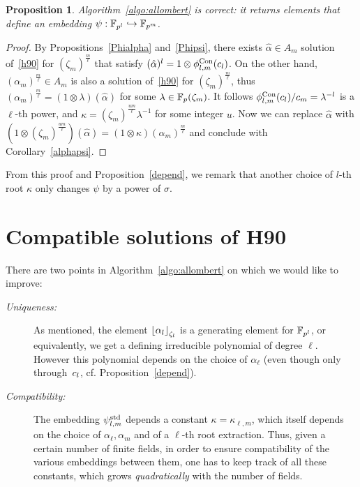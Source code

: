 \documentclass{sig-alternate}
\newtheorem{proposition}[theorem]{Proposition}
\begin{document}
\begin{proposition}
  Algorithm~\ref{algo:allombert} is correct: it returns elements that define an
  embedding $\psi:\mathbb{F}_{p^l}\hookrightarrow\mathbb{F}_{p^m}$.
\end{proposition}
\begin{proof}
By Propositions~\ref{Phialpha} and~\ref{Phipsi}, there exists $\hat{\alpha}\in A_m$
solution of~\eqref{h90} for $(\zeta_m)^{\frac{m}{\ell}}$ that satisfy $(\hat{\alpha})^l=1\otimes{\phi^{\textrm{Con}}_{{l},{m}}}(c_l)$.
On the other hand, $(\alpha_m)^{\frac{m}{\ell}}\in A_m$ is also a solution of~\eqref{h90} for $(\zeta_m)^{\frac{m}{\ell}}$,
thus $(\alpha_m)^{\frac{m}{\ell}}=(1\otimes\lambda)(\hat{\alpha})$ for some $\lambda\in\mathbb{F}_{p}(\zeta_m)$.
It follows ${\phi^{\textrm{Con}}_{{l},{m}}}(c_l)/c_m=\lambda^{-l}$ is a $\ell$-th power,
and $\kappa = (\zeta_{m})^{\frac{um}{\ell}}\lambda^{-1}$ for some integer $u$.
Now we can replace $\hat{\alpha}$
with $(1\otimes(\zeta_{m})^{\frac{um}{\ell}})(\hat{\alpha})=(1\otimes\kappa)(\alpha_m)^{\frac{m}{\ell}}$
and conclude with Corollary~\ref{alphapsi}.
\end{proof}
From this proof and Proposition~\ref{depend}, we remark that another choice of $l$-th root $\kappa$
only changes $\psi$ by a power of $\sigma$.
    
\section{Compatible solutions of H90}
\label{sec:compatibleH90}

There are two points in Algorithm~\ref{algo:allombert} on which we would like to improve:
\begin{description}
\item[\emph{Uniqueness:}] As mentioned, the element $\left\lfloor \alpha_{l} \right\rfloor_{\zeta_l}$ is a generating element for $\mathbb{F}_{p^{l}}$,
or equivalently, we get a defining irreducible polynomial of degree $\ell$.
However this polynomial depends on the choice of $\alpha_{\ell}$
(even though only through~$c_l$, cf. Proposition~\ref{depend}).
\item[\emph{Compatibility:}] The embedding ${\psi^{\textrm{std}}_{{l},{m}}}$ depends a constant $\kappa=\kappa_{\ell,m}$,
which itself depends on the choice of $\alpha_\ell,\alpha_m$ and of a $\ell$-th root extraction.
Thus, given a certain number of finite fields, in order to ensure compatibility of the various
embeddings between them, one has to keep track of all these constants, which grows \emph{quadratically}
with the number of fields.
\end{description}
\end{document}

